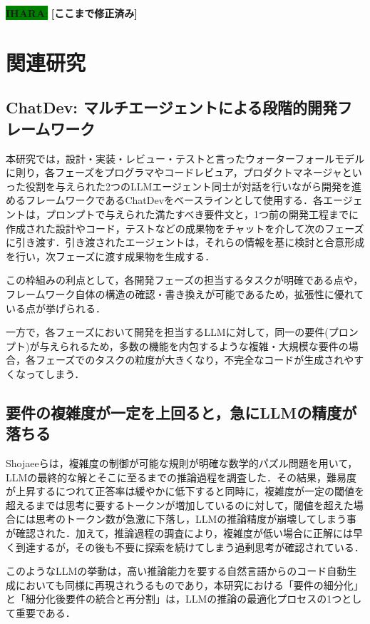 \documentclass[submit,techrep,noauthor]{ipsj}
\newcommand{\ihara}[1]{\colorbox{green}{{\bf IHARA}:}{\color{blue} {\textbf{[#1]}}}}
\begin{document}
\ihara{ここまで修正済み}
\section{関連研究}
\label{sec:related}

\subsection{ChatDev: マルチエージェントによる段階的開発フレームワーク}
本研究では，設計・実装・レビュー・テストと言ったウォーターフォールモデルに則り，各フェーズをプログラマやコードレビュア，プロダクトマネージャといった役割を与えられた2つのLLMエージェント同士が対話を行いながら開発を進めるフレームワークであるChatDev\cite{qian-etal-2024-chatdev}をベースラインとして使用する．各エージェントは，プロンプトで与えられた満たすべき要件文と，1つ前の開発工程までに作成された設計やコード，テストなどの成果物をチャットを介して次のフェーズに引き渡す．引き渡されたエージェントは，それらの情報を基に検討と合意形成を行い，次フェーズに渡す成果物を生成する．

この枠組みの利点として，各開発フェーズの担当するタスクが明確である点や，フレームワーク自体の構造の確認・書き換えが可能であるため，拡張性に優れている点が挙げられる．

一方で，各フェーズにおいて開発を担当するLLMに対して，同一の要件(プロンプト)が与えられるため，多数の機能を内包するような複雑・大規模な要件の場合，各フェーズでのタスクの粒度が大きくなり，不完全なコードが生成されやすくなってしまう．


\subsection{要件の複雑度が一定を上回ると，急にLLMの精度が落ちる}
Shojaeeら\cite{IllusionApple}は，複雑度の制御が可能な規則が明確な数学的パズル問題を用いて，LLMの最終的な解とそこに至るまでの推論過程を調査した．その結果，難易度が上昇するにつれて正答率は緩やかに低下すると同時に，複雑度が一定の閾値を超えるまでは思考に要するトークンが増加しているのに対して，閾値を超えた場合には思考のトークン数が急激に下落し，LLMの推論精度が崩壊してしまう事が確認された．加えて，推論過程の調査により，複雑度が低い場合に正解には早く到達するが，その後も不要に探索を続けてしまう過剰思考が確認されている．

このようなLLMの挙動は，高い推論能力を要する自然言語からのコード自動生成においても同様に再現されうるものであり，本研究における「要件の細分化」と「細分化後要件の統合と再分割」は，LLMの推論の最適化プロセスの1つとして重要である．
\end{document}
